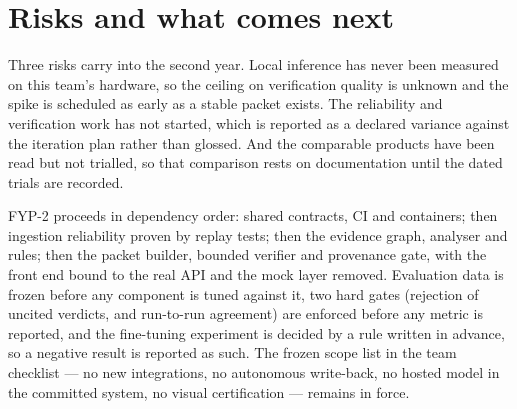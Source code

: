\section*{Risks and what comes next}

Three risks carry into the second year. Local inference has never been measured
on this team's hardware, so the ceiling on verification quality is unknown and
the spike is scheduled as early as a stable packet exists. The reliability and
verification work has not started, which is reported as a declared variance
against the iteration plan rather than glossed. And the comparable products have
been read but not trialled, so that comparison rests on documentation until the
dated trials are recorded.

FYP-2 proceeds in dependency order: shared contracts, CI and containers; then
ingestion reliability proven by replay tests; then the evidence graph, analyser
and rules; then the packet builder, bounded verifier and provenance gate, with
the front end bound to the real API and the mock layer removed. Evaluation data
is frozen before any component is tuned against it, two hard gates (rejection of
uncited verdicts, and run-to-run agreement) are enforced before any metric is
reported, and the fine-tuning experiment is decided by a rule written in advance,
so a negative result is reported as such. The frozen scope list in the team
checklist --- no new integrations, no autonomous write-back, no hosted model in
the committed system, no visual certification --- remains in force.
